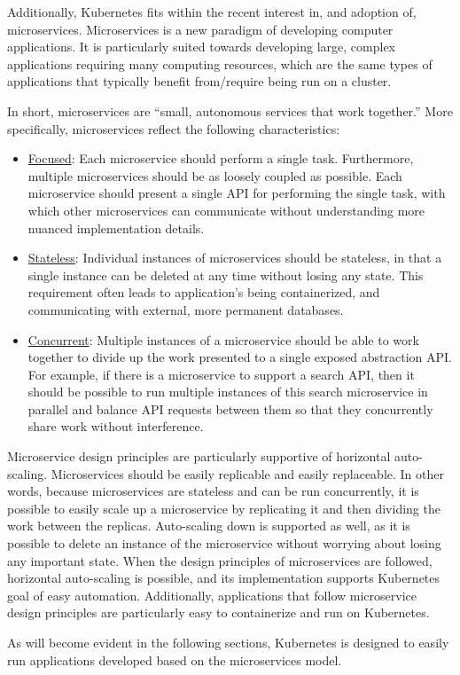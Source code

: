 Additionally, Kubernetes fits within the recent interest in, and adoption of,
microservices. Microservices is a new paradigm of developing computer
applications. It is particularly suited towards developing large, complex
applications requiring many computing resources, which are the
same types of applications that typically benefit from/require
being run on a cluster.

In short, microservices are ``small, autonomous services that work
together.''\cite{building-microservices-designing-fine-grained-systems}
More specifically, microservices reflect the following characteristics:

\begin{itemize}
  \item \underline{Focused}: Each microservice should perform a single task.
    Furthermore, multiple microservices should be as loosely coupled as
    possible. Each microservice should present a single API for performing the
    single task, with which other microservices can communicate without
    understanding more nuanced implementation
    details.\cite{building-microservices-designing-fine-grained-systems}
  \item \underline{Stateless}: Individual instances of microservices should be stateless, in
    that a single instance can be deleted at any time without losing any state.
    This requirement often leads to application's being containerized, and
    communicating with external, more permanent databases.
  \item \underline{Concurrent}: Multiple instances of a microservice should be
    able to work together to divide up the work presented to a single
    exposed abstraction API. For example, if there is a microservice to support
    a search API, then it should be possible to run multiple instances of this
    search microservice in parallel and balance API requests between them so that they
    concurrently share work without interference.
\end{itemize}

Microservice design principles are particularly supportive of horizontal
auto-scaling. Microservices should be easily replicable and easily replaceable.
In other words, because microservices are stateless and can be run concurrently,
it is possible to easily scale up a microservice by replicating it and then
dividing the work between the replicas. Auto-scaling down is supported as well, as it is
possible to delete an instance of the microservice without worrying about
losing any important state. When the design principles of
microservices are followed, horizontal auto-scaling is possible, and its
implementation supports Kubernetes goal of easy automation. Additionally,
applications that follow microservice design principles are particularly easy to
containerize and run on Kubernetes.

As will become evident in the following sections, Kubernetes is designed to
easily run applications developed based on the microservices model.
